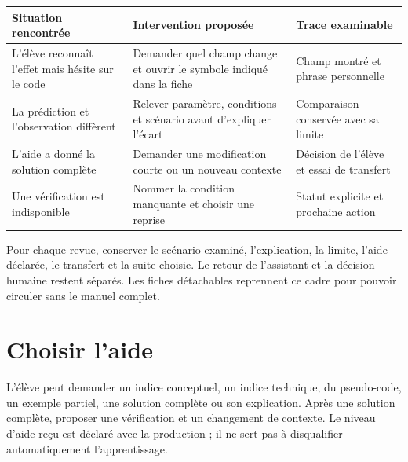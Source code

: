 \documentclass[
  canadien,
  11pt,
  a4paper,
]{report}
\newcounter{none} %
\begin{document}
{\def\LTcaptype{none} %
\begin{longtable}[]{@{}
  >{\raggedright\arraybackslash}p{}
  >{\raggedright\arraybackslash}p{}
  >{\raggedright\arraybackslash}p{}@{}}
\toprule\noalign{}
\begin{minipage}[b]{\linewidth}\raggedright
Situation rencontrée
\end{minipage} & \begin{minipage}[b]{\linewidth}\raggedright
Intervention proposée
\end{minipage} & \begin{minipage}[b]{\linewidth}\raggedright
Trace examinable
\end{minipage} \\
\midrule\noalign{}
\endhead
\bottomrule\noalign{}
\endlastfoot
L'élève reconnaît l'effet mais hésite sur le code & Demander quel champ
change et ouvrir le symbole indiqué dans la fiche & Champ montré et
phrase personnelle \\
La prédiction et l'observation diffèrent & Relever paramètre, conditions
et scénario avant d'expliquer l'écart & Comparaison conservée avec sa
limite \\
L'aide a donné la solution complète & Demander une modification courte
ou un nouveau contexte & Décision de l'élève et essai de transfert \\
Une vérification est indisponible & Nommer la condition manquante et
choisir une reprise & Statut explicite et prochaine action \\
\end{longtable}
}

Pour chaque revue, conserver le scénario examiné, l'explication, la
limite, l'aide déclarée, le transfert et la suite choisie. Le retour de
l'assistant et la décision humaine restent séparés. Les fiches
détachables reprennent ce cadre pour pouvoir circuler sans le manuel
complet.

\section{Choisir l'aide}\label{choisir-laide}

L'élève peut demander un indice conceptuel, un indice technique, du
pseudo-code, un exemple partiel, une solution complète ou son
explication. Après une solution complète, proposer une vérification et
un changement de contexte. Le niveau d'aide reçu est déclaré avec la
production ; il ne sert pas à disqualifier automatiquement
l'apprentissage.
\end{document}
